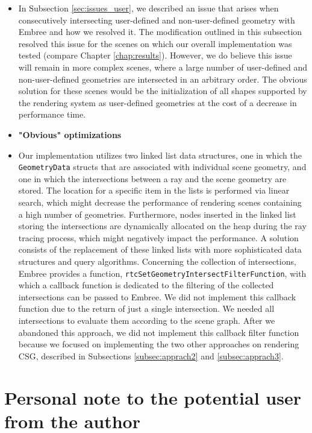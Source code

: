 \begin{itemize}
	\item[] In Subsection \ref{sec:issues_user}, we described an issue that arises when consecutively intersecting user-defined and non-user-defined geometry with Embree and how we resolved it. The modification outlined in this subsection resolved this issue for the scenes on which our overall implementation was tested (compare Chapter \ref{chap:results}). However, we do believe this issue will remain in more complex scenes, where a large number of user-defined and non-user-defined geometries are intersected in an arbitrary order. The obvious solution for these scenes would be the initialization of all shapes supported by the rendering system as user-defined geometries at the cost of a decrease in performance time.
	\\
	
	\item \textbf{"Obvious" optimizations}
	
	\item[] Our implementation utilizes two linked list data structures, one in which the \texttt{GeometryData} structs that are associated with individual scene geometry, and one in which the intersections between a ray and the scene geometry are stored. The location for a specific item in the lists is performed via linear search, which might decrease the performance of rendering scenes containing a high number of geometries. Furthermore, nodes inserted in the linked list storing the intersections are dynamically allocated on the heap during the ray tracing process, which might negatively impact the performance. A solution consists of the replacement of these linked lists with more sophisticated data structures and query algorithms. Concerning the collection of intersections, Embree provides a function, \texttt{rtcSetGeometryIntersectFilterFunction}, with which a callback function is dedicated to the filtering of the collected intersections can be passed to Embree. We did not implement this callback function due to the return of just a single intersection. We needed all intersections to evaluate them according to the scene graph. After we abandoned this approach, we did not implement this callback filter function because we focused on implementing the two other approaches on rendering CSG, described in Subsections \ref{subsec:apprach2} and \ref{subsec:apprach3}.
	
\end{itemize}


\section*{Personal note to the potential user from the author}

